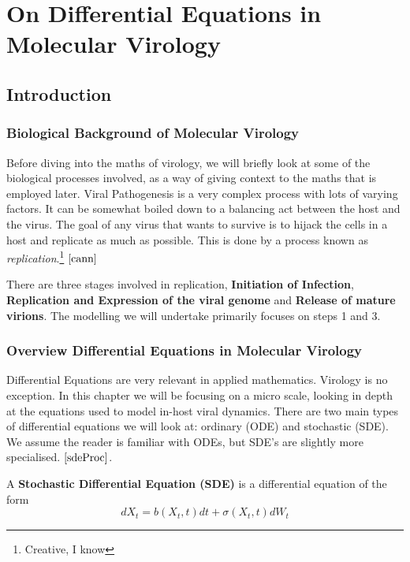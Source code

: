 \chapter{On Differential Equations in Molecular Virology}

\section{Introduction}

\subsection{Biological Background of Molecular Virology}

Before diving into the maths of virology, we will briefly look at some of the biological processes involved, as a way of giving context to the maths that is employed later. Viral Pathogenesis is a very complex process with lots of varying factors. It can be somewhat boiled down to a balancing act between the host and the virus. The goal of any virus that wants to survive is to hijack the cells in a host and replicate as much as possible. This is done by a process known as \textit{replication}.\footnote{Creative, I know} $\cite{cann}$

There are three stages involved in replication, \textbf{Initiation of Infection}, \textbf{Replication and Expression of the viral genome} and  \textbf{Release of mature virions}. The modelling we will undertake primarily focuses on steps 1 and 3. 

\subsection{Overview Differential Equations in Molecular Virology}

Differential Equations are very relevant in applied mathematics. Virology is no exception. In this chapter we will be focusing on a micro scale, looking in depth at the equations used to model in-host viral dynamics. There are two main types of differential equations we will look at: ordinary (ODE) and stochastic (SDE). 
We assume the reader is familiar with ODEs, but SDE's are slightly more specialised. $\cite{sdeProc}$.

\begin{definition}
    A \textbf{Stochastic Differential Equation (SDE)} is a differential equation of the form 
    \[
        dX_t = b(X_t,t)dt + \sigma (X_t,t)dW_t
    \]  
\end{definition}

